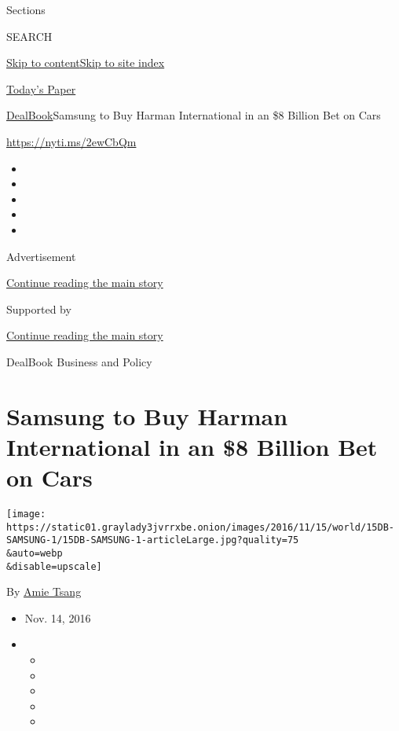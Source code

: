 Sections

SEARCH

\protect\hyperlink{site-content}{Skip to
content}\protect\hyperlink{site-index}{Skip to site index}

\href{https://myaccount.nytimes3xbfgragh.onion/auth/login?response_type=cookie\&client_id=vi}{}

\href{https://www.nytimes3xbfgragh.onion/section/todayspaper}{Today's
Paper}

\href{/section/business/dealbook}{DealBook}\textbar{}Samsung to Buy
Harman International in an \$8 Billion Bet on Cars

\url{https://nyti.ms/2ewCbQm}

\begin{itemize}
\item
\item
\item
\item
\item
\end{itemize}

Advertisement

\protect\hyperlink{after-top}{Continue reading the main story}

Supported by

\protect\hyperlink{after-sponsor}{Continue reading the main story}

DealBook Business and Policy

\hypertarget{samsung-to-buy-harman-international-in-an-8-billion-bet-on-cars}{%
\section{Samsung to Buy Harman International in an \$8 Billion Bet on
Cars}\label{samsung-to-buy-harman-international-in-an-8-billion-bet-on-cars}}

\texttt{[image: https://static01.graylady3jvrrxbe.onion/images/2016/11/15/world/15DB-SAMSUNG-1/15DB-SAMSUNG-1-articleLarge.jpg?quality=75\\\&auto=webp\\\&disable=upscale]}

By \href{http://www.nytimes3xbfgragh.onion/by/amie-tsang}{Amie Tsang}

\begin{itemize}
\item
  Nov. 14, 2016
\item
  \begin{itemize}
  \item
  \item
  \item
  \item
  \item
  \end{itemize}
\end{itemize}

